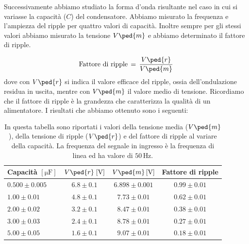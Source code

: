 Successivamente abbiamo studiato la forma d'onda risultante nel caso in cui si variasse la capacità ($C$) del condensatore. Abbiamo misurato la frequenza e l'ampiezza del ripple per quattro valori di capacità. Inoltre sempre per gli stessi valori abbiamo misurato la tensione $V\ped{m}$ e abbiamo determinato il fattore di ripple.

\begin{equation}
	\text{Fattore di ripple} \,=\, \frac{V\ped{r}}{V\ped{m}}
\end{equation}
%
dove con $V\ped{r}$ si indica il valore efficace del ripple, ossia dell’ondulazione residua in uscita, mentre con $V\ped{m}$ il valore medio di tensione.
Ricordiamo che il fattore di ripple è la grandezza che caratterizza la qualità di un alimentatore.
I risultati che abbiamo ottenuto sono i seguenti:

\begin{table}[H]
    \centering
    \small
    \begin{tabular}{l c c c}
        \toprule
		Capacità $[\si{\micro\farad}]$ & $V\ped{r} \; [\si{\volt}]$ & $V\ped{m} \, [\si{\volt}]$ & Fattore di ripple \\
        \midrule
		$ 0.500 \pm 0.005 $ & $6.8 \pm 0.1 $ & $ 6.898 \pm 0.001 $ & $ 0.99 \pm 0.01 $ \\
		$ 1.00 \pm 0.01 $ & $ 4.8 \pm 0.1$ & $ 7.73 \pm 0.01 $ & $ 0.62 \pm 0.01$ \\
		$ 2.00 \pm 0.02 $ & $ 3.2 \pm 0.1$ & $ 8.47 \pm 0.01 $ & $ 0.38 \pm 0.01$ \\
		$ 3.00 \pm 0.03 $ & $ 2.4 \pm 0.1$ & $ 8.78 \pm 0.01 $ & $ 0.27 \pm 0.01$ \\
		$ 5.00 \pm 0.05 $ & $ 1.6 \pm 0.1$ & $ 9.07 \pm 0.01 $ & $ 0.18 \pm 0.01$ \\
        \bottomrule
    \end{tabular}
    \caption{In questa tabella sono riportati i valori della tensione media ($V\ped{m}$), della tensione di ripple ($V\ped{r}$) e del fattore di ripple al variare della capacità. La frequenza del segnale in ingresso è la frequenza di linea ed ha valore di $50\,\si{\hertz}$. }
    \label{tab:ripple}
\end{table}








